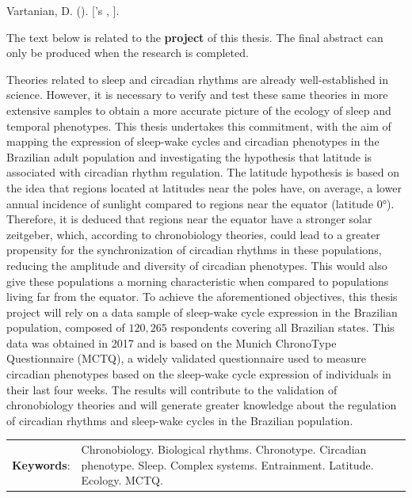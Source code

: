 \documentclass[
12pt,
openright,
oneside,
a4paper,
chapter=TITLE,
section=TITLE,
french,
spanish,
brazil,
english
]{abntex2}\usepackage{array}
\renewcommand{\resumoname}{Abstract}
\renewcommand{\resumoname}{Resumo}
\renewcommand{\resumoname}{Resumen}
\renewcommand{\resumoname}{Résumé}
\providecommand{\imprimiruniversidade}{}
\providecommand{\imprimirtipodetituloacademico}{}
\newenvironment{resumoenv}[1][\resumoname]{
  \pretextualchapter{#1}
  \begingroup
  \setlength{\parindent}{0cm}
  \setlength{\parskip}{\smallskipamount} %
  \AtBeginEnvironment{tabular}{\normalsize}
  \renewcommand{\arraystretch}{1}
  \setlength{\aboverulesep}{0ex}
  \setlength{\belowrulesep}{0ex}
  \setlength{\arrayrulewidth}{0pt}
  \setlength{\tabcolsep}{0cm}
  \vspace{-\smallskipamount} %
  \begin{SingleSpace}
}{
  \end{SingleSpace}
  \cleardoublepage
  \endgroup
}
\begin{document}
\begin{resumoenv}[\resumoname]
Vartanian, D. ({\imprimirdata}). \textit{\imprimirtitulo} [{\imprimirtipodetituloacademico}'s {\imprimirtipotrabalho}, {\imprimiruniversidade}].


The text below is related to the \textbf{project} of this thesis. The
final abstract can only be produced when the research is completed.

Theories related to sleep and circadian rhythms are already
well-established in science. However, it is necessary to verify and test
these same theories in more extensive samples to obtain a more accurate
picture of the ecology of sleep and temporal phenotypes. This thesis
undertakes this commitment, with the aim of mapping the expression of
sleep-wake cycles and circadian phenotypes in the Brazilian adult
population and investigating the hypothesis that latitude is associated
with circadian rhythm regulation. The latitude hypothesis is based on
the idea that regions located at latitudes near the poles have, on
average, a lower annual incidence of sunlight compared to regions near
the equator (latitude 0°). Therefore, it is deduced that regions near
the equator have a stronger solar zeitgeber, which, according to
chronobiology theories, could lead to a greater propensity for the
synchronization of circadian rhythms in these populations, reducing the
amplitude and diversity of circadian phenotypes. This would also give
these populations a morning characteristic when compared to populations
living far from the equator. To achieve the aforementioned objectives,
this thesis project will rely on a data sample of sleep-wake cycle
expression in the Brazilian population, composed of \(120,265\)
respondents covering all Brazilian states. This data was obtained in
2017 and is based on the Munich ChronoType Questionnaire (MCTQ), a
widely validated questionnaire used to measure circadian phenotypes
based on the sleep-wake cycle expression of individuals in their last
four weeks. The results will contribute to the validation of
chronobiology theories and will generate greater knowledge about the
regulation of circadian rhythms and sleep-wake cycles in the Brazilian
population.


\begin{tabular}{p{2.3cm} p{13.6cm}}
  \textbf{Keywords}: & Chronobiology. Biological rhythms. Chronotype. Circadian phenotype. Sleep. Complex systems. Entrainment. Latitude. Ecology. MCTQ.
\end{tabular}
\end{resumoenv}
\end{document}
